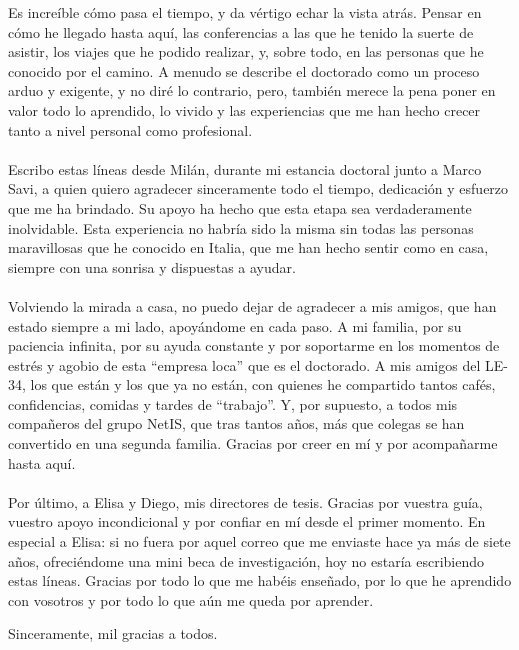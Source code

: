 \vspace{1cm}

Es increíble cómo pasa el tiempo, y da vértigo echar la vista atrás. Pensar en cómo he llegado hasta aquí, las conferencias a las que he tenido la suerte de asistir, los viajes que he podido realizar, y, sobre todo, en las personas que he conocido por el camino. A menudo se describe el doctorado como un proceso arduo y exigente, y no diré lo contrario, pero, también merece la pena poner en valor todo lo aprendido, lo vivido y las experiencias que me han hecho crecer tanto a nivel personal como profesional.\\
\\
Escribo estas líneas desde Milán, durante mi estancia doctoral junto a Marco Savi, a quien quiero agradecer sinceramente todo el tiempo, dedicación y esfuerzo que me ha brindado. Su apoyo ha hecho que esta etapa sea verdaderamente inolvidable. Esta experiencia no habría sido la misma sin todas las personas maravillosas que he conocido en Italia, que me han hecho sentir como en casa, siempre con una sonrisa y dispuestas a ayudar.\\
\\
Volviendo la mirada a casa, no puedo dejar de agradecer a mis amigos, que han estado siempre a mi lado, apoyándome en cada paso. A mi familia, por su paciencia infinita, por su ayuda constante y por soportarme en los momentos de estrés y agobio de esta ``empresa loca'' que es el doctorado. A mis amigos del LE-34, los que están y los que ya no están, con quienes he compartido tantos cafés, confidencias, comidas y tardes de ``trabajo''. Y, por supuesto, a todos mis compañeros del grupo NetIS, que tras tantos años, más que colegas se han convertido en una segunda familia. Gracias por creer en mí y por acompañarme hasta aquí.\\
\\
Por último, a Elisa y Diego, mis directores de tesis. Gracias por vuestra guía, vuestro apoyo incondicional y por confiar en mí desde el primer momento. En especial a Elisa: si no fuera por aquel correo que me enviaste hace ya más de siete años, ofreciéndome una mini beca de investigación, hoy no estaría escribiendo estas líneas. Gracias por todo lo que me habéis enseñado, por lo que he aprendido con vosotros y por todo lo que aún me queda por aprender.

\vspace{0.5cm}

Sinceramente, mil gracias a todos.



